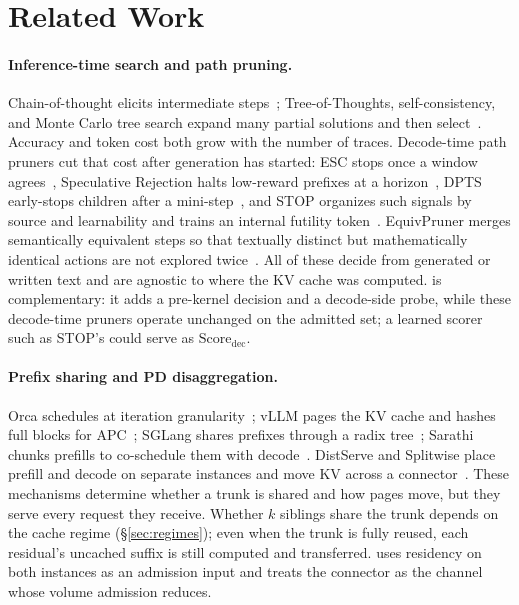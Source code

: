 \section{Related Work}
\label{sec:related}

\paragraph{Inference-time search and path pruning.}
Chain-of-thought elicits intermediate steps~\cite{cot}; Tree-of-Thoughts, self-consistency, and Monte Carlo tree search expand many partial solutions and then select~\cite{tot,selfconsistency,mctsllm}.
Accuracy and token cost both grow with the number of traces.
Decode-time path pruners cut that cost after generation has started: ESC stops once a window agrees~\cite{esc}, Speculative Rejection halts low-reward prefixes at a horizon~\cite{specrej}, DPTS early-stops children after a mini-step~\cite{dpts}, and STOP organizes such signals by source and learnability and trains an internal futility token~\cite{stoploss}.
EquivPruner merges semantically equivalent steps so that textually distinct but mathematically identical actions are not explored twice~\cite{equivpruner}.
All of these decide from generated or written text and are agnostic to where the KV cache was computed.
\sys is complementary: it adds a pre-kernel decision and a decode-side probe, while these decode-time pruners operate unchanged on the admitted set; a learned scorer such as STOP's could serve as $\mathrm{Score}_{\mathrm{dec}}$.

\paragraph{Prefix sharing and PD disaggregation.}
Orca schedules at iteration granularity~\cite{orca}; vLLM pages the KV cache and hashes full blocks for APC~\cite{vllm}; SGLang shares prefixes through a radix tree~\cite{sglang}; Sarathi chunks prefills to co-schedule them with decode~\cite{sarathi,sarathisplit}.
DistServe and Splitwise place prefill and decode on separate instances and move KV across a connector~\cite{distserve,splitwise}.
These mechanisms determine whether a trunk is shared and how pages move, but they serve every request they receive.
Whether $k$ siblings share the trunk depends on the cache regime (\S\ref{sec:regimes}); even when the trunk is fully reused, each residual's uncached suffix is still computed and transferred.
\sys uses residency on both instances as an admission input and treats the connector as the channel whose volume admission reduces.

